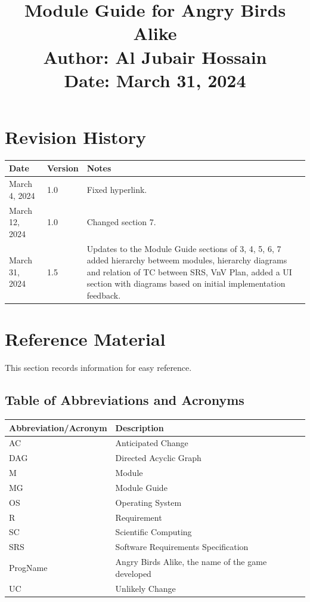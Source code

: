 \documentclass[12pt]{article}
\title{
    {\Huge Module Guide for Angry Birds Alike} \\
    {\Large Author: Al Jubair Hossain} \\
    {\large Date: March 31, 2024}
}
\date{}
\begin{document}
\maketitle

\newpage

\section*{Revision History}
\begin{longtable}{|p{2cm}|p{2cm}|p{10cm}|}
    \hline
    \textbf{Date} & \textbf{Version} & \textbf{Notes} \\
    \hline
    March 4, 2024 & 1.0 & Fixed hyperlink. \\\hline
    March 12, 2024 & 1.0 & Changed section 7. \\\hline
    March 31, 2024 & 1.5 & Updates to the Module Guide sections of 3, 4, 5, 6, 7 added hierarchy betweem modules, hierarchy diagrams and relation of TC between SRS, VnV Plan, added a UI section with diagrams based on initial implementation feedback. \\
    \hline
\end{longtable}

\newpage

\tableofcontents

\newpage

\section{Reference Material}
This section records information for easy reference.

\subsection{Table of Abbreviations and Acronyms}
\begin{longtable}{|l|l|}
    \hline
    \textbf{Abbreviation/Acronym} & \textbf{Description} \\
    \hline
    AC & Anticipated Change \\
    DAG & Directed Acyclic Graph \\
    M & Module \\
    MG & Module Guide \\
    OS & Operating System \\
    R & Requirement \\
    SC & Scientific Computing \\
    SRS & Software Requirements Specification \\
    ProgName & Angry Birds Alike, the name of the game developed \\
    UC & Unlikely Change \\
    \hline
\end{longtable}
\end{document}
